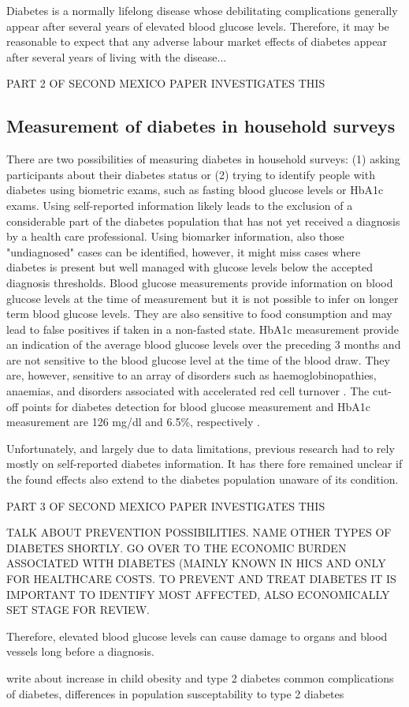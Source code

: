 Diabetes is a normally lifelong disease whose debilitating complications generally appear after several years of elevated blood glucose levels. Therefore, it may be reasonable to expect that any adverse labour market effects of diabetes appear after several years of living with the disease...

PART 2 OF SECOND MEXICO PAPER INVESTIGATES THIS

\subsection{Measurement of diabetes in household surveys}

There are two possibilities of measuring diabetes in household surveys: (1) asking participants about their diabetes status or (2) trying to identify people with diabetes using biometric exams, such as fasting blood glucose levels or \ac{HbA1c} exams. Using self-reported information likely leads to the exclusion of a considerable part of the diabetes population that has not yet received a diagnosis by a health care professional. Using biomarker information, also those "undiagnosed" cases can be identified, however, it might miss cases where diabetes is present but well managed with glucose levels below the accepted diagnosis thresholds. Blood glucose measurements provide information on blood glucose levels at the time of measurement but it is not possible to infer on longer term blood glucose levels. They are also sensitive to food consumption and may lead to false positives if taken in a non-fasted state. \ac{HbA1c} measurement provide an indication of the average blood glucose levels over the preceding 3 months and are not sensitive to the blood glucose level at the time of the blood draw. They are, however, sensitive to an array of disorders such as haemoglobinopathies, anaemias, and disorders associated with accelerated red cell turnover \parencite{WorldHealthOrganization2011}. The cut-off points for diabetes detection for blood glucose measurement and \ac{HbA1c} measurement are 126 mg/dl and 6.5\%, respectively \parencite{WHO2006,WorldHealthOrganization2011}.

Unfortunately, and largely due to data limitations, previous research had to rely mostly on self-reported diabetes information. It has there fore remained unclear if the found effects also extend to the diabetes population unaware of its condition.

PART 3 OF SECOND MEXICO PAPER INVESTIGATES THIS

TALK ABOUT PREVENTION POSSIBILITIES. NAME OTHER TYPES OF DIABETES SHORTLY. GO OVER TO THE ECONOMIC BURDEN ASSOCIATED WITH DIABETES (MAINLY KNOWN IN HICS AND ONLY FOR HEALTHCARE COSTS. TO PREVENT AND TREAT DIABETES IT IS IMPORTANT TO IDENTIFY MOST AFFECTED, ALSO ECONOMICALLY SET STAGE FOR REVIEW.

 Therefore, elevated blood glucose levels can cause damage to organs and blood vessels long before a diagnosis.

write about increase in child obesity and type 2 diabetes
common complications of diabetes, differences in population susceptability to type 2 diabetes

